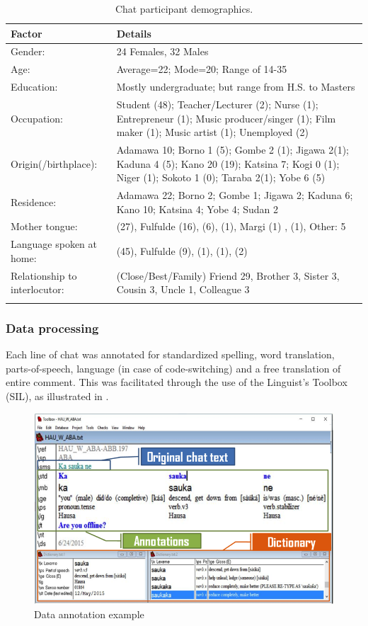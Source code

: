 \documentclass[output=paper
,newtxmath
,modfonts
,nonflat]{langsci/langscibook}
\begin{document}
\begin{table}
\begin{tabularx}{\textwidth}{lQ}
\lsptoprule
 Factor &  Details\\
\midrule
Gender: & 24 Females, 32 Males\\
Age: & Average=22; Mode=20; Range of 14-35\\
Education: & Mostly undergraduate; but range from H.S. to Masters\\
Occupation: & Student (48); Teacher/Lecturer (2); Nurse (1); Entrepreneur (1); Music producer/singer (1); Film maker (1); Music artist (1); Unemployed (2)\\
Origin(/birthplace): & Adamawa 10; Borno 1 (5); Gombe 2 (1); Jigawa 2(1); Kaduna 4 (5); Kano 20 (19); Katsina 7; Kogi 0 (1); Niger (1); Sokoto 1 (0); Taraba 2(1); Yobe 6 (5)\\
Residence: & Adamawa 22; Borno 2; Gombe 1; Jigawa 2; Kaduna 6; Kano 10; Katsina 4; Yobe 4; Sudan 2\\
Mother tongue: &  (27), Fulfulde (16),  (6),  (1), Margi (1) ,  (1), Other: 5\\
Language spoken at home: &  (45), Fulfulde (9),  (1),  (1),  (2)\\
Relationship to interlocutor: & (Close/Best/Family) Friend 29, Brother 3, Sister 3, Cousin 3, Uncle 1, Colleague 3\\
\lspbottomrule
\end{tabularx}  
\caption{Chat participant demographics.}
\label{tab:purvis:1}
\end{table} 

\subsubsection{Data processing}

Each line of chat was annotated for standardized spelling, word translation, parts-of-speech, language (in case of code-switching) and a free translation of entire comment. This was facilitated through the use of the Linguist’s Toolbox (SIL), as illustrated in .

 
\begin{figure}
\includegraphics[width=\textwidth]{figures/purvis-fig1.png}
\caption{Data annotation example}
\label{fig:purvis:1}
\end{figure}
 
\end{document}
